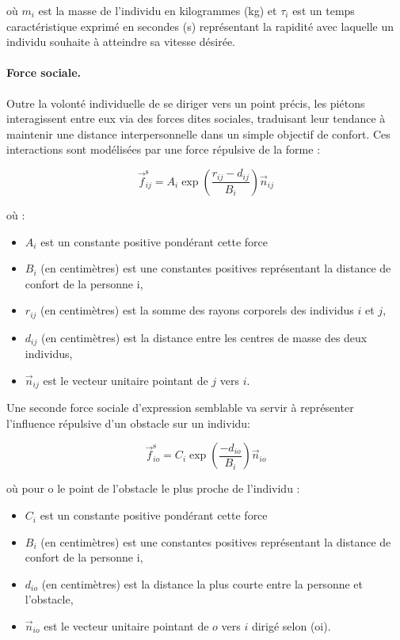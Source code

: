 \documentclass[a4paper,12pt]{article}
\begin{document}
où $m_i$ est la masse de l'individu en kilogrammes (kg) et $\tau_i$ est un temps caractéristique exprimé en secondes (s) représentant la rapidité avec laquelle un individu souhaite à atteindre sa vitesse désirée.

\paragraph{Force sociale.}
Outre la volonté individuelle de se diriger vers un point précis, les piétons interagissent entre eux via des forces dites sociales, traduisant leur tendance à maintenir une distance interpersonnelle dans un simple objectif de confort. Ces interactions sont modélisées par une force répulsive de la forme :

\begin{equation}
\label{eq:force_sociale}
\vec{f}_{ij}^{\text{s}} = A_i \exp\left(\frac{r_{ij} - d_{ij}}{B_i}\right) \vec{n}_{ij}
\end{equation}

où :
\begin{itemize}
  \item $A_i$ est un constante positive pondérant cette force
  \item  $B_i$ (en centimètres) est une constantes positives représentant la distance de confort de la personne i,
  \item $r_{ij}$ (en centimètres) est la somme des rayons corporels des individus $i$ et $j$,
  \item $d_{ij}$ (en centimètres) est la distance entre les centres de masse des deux individus,
  \item $\vec{n}_{ij}$ est le vecteur unitaire pointant de $j$ vers $i$.
\end{itemize}

Une seconde force sociale d'expression semblable va servir à représenter l'influence répulsive d'un obstacle sur un individu:

\begin{equation}
\vec{f}_{io}^{\text{s}} = C_i \exp\left(\frac{- d_{io}}{B_i}\right) \vec{n}_{io}
\end{equation}

où pour o le point de l'obstacle le plus proche de l'individu :
\begin{itemize}
  \item $C_i$ est un constante positive pondérant cette force
  \item  $B_i$ (en centimètres) est une constantes positives représentant la distance de confort de la personne i,
  \item $d_{io}$ (en centimètres) est la distance la plus courte entre la personne et l'obstacle,
  \item $\vec{n}_{io}$ est le vecteur unitaire pointant de $o$ vers $i$ dirigé selon (oi).
\end{itemize}
\end{document}
